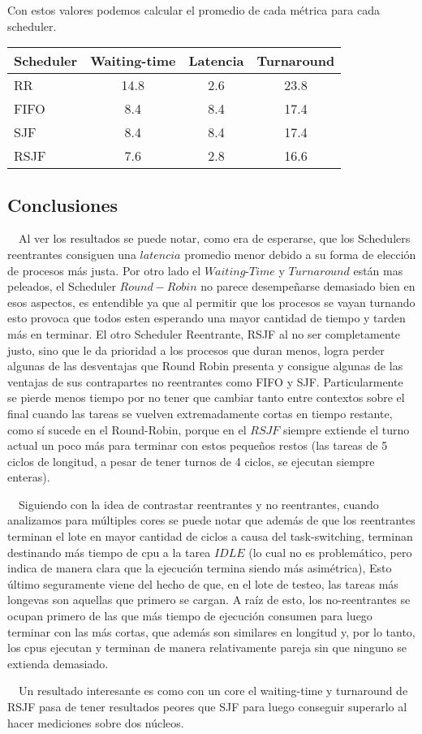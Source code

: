 Con estos valores podemos calcular el promedio de cada métrica para cada scheduler.

\begin{center}
        \begin{tabular}{| l | c | c | c |}
                \hline
    Scheduler & Waiting-time & Latencia & Turnaround \\
                \hline
    RR   &    14.8 &  2.6 & 23.8 \\
    FIFO &     8.4 &  8.4 & 17.4 \\
    SJF  &     8.4 &  8.4 & 17.4 \\
    RSJF &     7.6 &  2.8 & 16.6 \\
                \hline
        \end{tabular}
\end{center}

\subsection{Conclusiones}

\ \ Al ver los resultados se puede notar, como era de esperarse, que los Schedulers reentrantes consiguen una $latencia$ promedio menor debido a su forma de elección de procesos más justa. Por otro lado el $Waiting$-$Time$ y $Turnaround$ están mas peleados, el Scheduler $Round-Robin$ no parece desempeñarse demasiado bien en esos aspectos, es entendible ya que al permitir que los procesos se vayan turnando esto provoca que todos esten esperando una mayor cantidad de tiempo y tarden más en terminar. El otro Scheduler Reentrante, RSJF al no ser completamente justo, sino que le da prioridad a los procesos que duran menos, logra perder algunas de las desventajas que Round Robin presenta y consigue algunas de las ventajas de sus contrapartes no reentrantes como FIFO y SJF. Particularmente se pierde menos tiempo por no tener que cambiar tanto entre contextos sobre el final cuando las tareas se vuelven extremadamente cortas en tiempo restante, como sí sucede en el Round-Robin, porque en el $RSJF$ siempre extiende el turno actual un poco más para terminar con estos pequeños restos (las tareas de 5 ciclos de longitud, a pesar de tener turnos de 4 ciclos, se ejecutan siempre enteras).

\ \ Siguiendo con la idea de contrastar reentrantes y no reentrantes, cuando analizamos para múltiples cores se puede notar que además de que los reentrantes terminan el lote en mayor cantidad de ciclos a causa del task-switching, terminan destinando más tiempo de cpu a la tarea $IDLE$ (lo cual no es problemático, pero indica de manera clara que la ejecución termina siendo más asimétrica), Esto último seguramente viene del hecho de que, en el lote de testeo, las tareas más longevas son aquellas que primero se cargan. A raíz de esto, los no-reentrantes se ocupan primero de las que más tiempo de ejecución consumen para luego terminar con las más cortas, que además son similares en longitud y, por lo tanto, los cpus ejecutan y terminan de manera relativamente pareja sin que ninguno se extienda demasiado.

\ \ Un resultado interesante es como con un core el waiting-time y turnaround de RSJF pasa de tener resultados peores que SJF para luego conseguir superarlo al hacer mediciones sobre dos núcleos.
